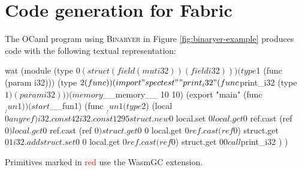 \chapter{Code generation for Fabric}
\label{extra:codegen}

The OCaml program using \textsc{Binaryer} in Figure \ref{fig:binaryer-example} produces \wasm{} code with the following textual representation:
\begin{center}
\begin{cminted}{wat}
(module
 (type $0 (struct (field (mut i32)) (field i32)))
 (type $1 (func (param i32)))
 (type $2 (func))
 (import "spectest" "print_i32" 
   (func $print_i32 (type $1) (param i32)))
 (memory $__memory__ 10 10)
 (export "main" (func $__fun1))
 (start $__fun1)
 (func $__fun1 (type $2)
  (local $0 anyref)
  i32.const 42
  i32.const 1295
  struct.new $0
  local.set $0
  local.get $0
  ref.cast (ref $0)
  local.get $0
  ref.cast (ref $0)
  struct.get $0 0
  local.get $0
  ref.cast (ref $0)
  struct.get $0 1
  i32.add
  struct.set $0 0
  local.get $0
  ref.cast (ref $0)
  struct.get $0 0
  call $print_i32
 )
)
\end{cminted}
\end{center}
Primitives marked in \textcolor{red}{red} use the WasmGC extension.